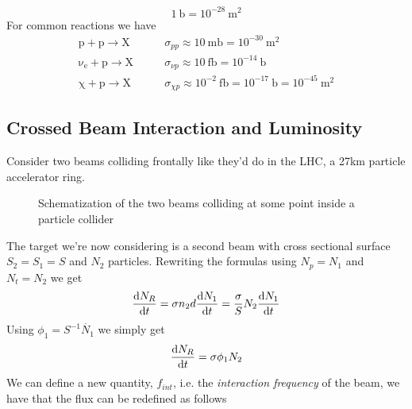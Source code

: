 \documentclass[../qm.tex]{subfiles}
\begin{document}
\begin{equation}
	1\ \mathrm{b}=10^{-28}\ \mathrm{m^2}
	\label{eq:barndef}
\end{equation}
For common reactions we have
\begin{equation}
	\begin{aligned}
		\mathrm{p+p\to X}&\qquad\sigma_{pp}\approx10\ \mathrm{mb}=10^{-30}\ \mathrm{m^2}\\
		\mathrm{\nu_e+p\to X}&\qquad\sigma_{\nu p}\approx10\ \mathrm{fb}=10^{-14}\ \mathrm{b}\\
		\mathrm{\chi+p\to X}&\qquad\sigma_{\chi p}\approx10^{-2}\ \mathrm{fb}=10^{-17}\ \mathrm{b}=10^{-45}\ \mathrm{m^2}
	\end{aligned}
	\label{eq:commonreaccscs}
\end{equation}
\subsection{Crossed Beam Interaction and Luminosity}
Consider two beams colliding frontally like they'd do in the LHC, a 27km particle accelerator ring.\\
\begin{figure}[H]
	\centering
	\caption{Schematization of the two beams colliding at some point inside a particle collider}
	\label{fig:twobeamcoll}
\end{figure}
The target we're now considering is a second beam with cross sectional surface $S_2=S_1=S$ and $N_2$ particles. Rewriting the formulas using $N_p=N_1$ and $N_t=N_2$ we get
\begin{equation*}
	\dv{N_R}{t}=\sigma n_2d\dv{N_1}{t}=\frac{\sigma}{S}N_2\dv{N_1}{t}
\end{equation*}
Using $\phi_1=S^{-1}\dot{N_1}$ we simply get
\begin{equation}
	\dv{N_R}{t}=\sigma\phi_1N_2
	\label{eq:crossbeamsigma}
\end{equation}
We can define a new quantity, $f_{int}$, i.e. the \emph{interaction frequency} of the beam, we have that the flux can be redefined as follows
\end{document}
